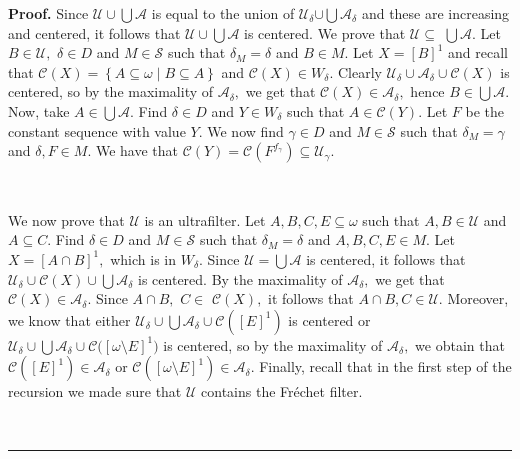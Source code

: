 \documentclass{article}%
\newenvironment{proof}[1][Proof]{\noindent\textbf{#1.} }{\ \rule{0.5em}{0.5em}}
\begin{document}
\begin{proof}
Since $\mathcal{U\cup}%
{\textstyle\bigcup}
\mathcal{A}$ is equal to the union of $\mathcal{U}_{\delta}\mathcal{\cup}%
{\textstyle\bigcup}
\mathcal{A}_{\delta}$ and these are increasing and centered, it follows that
$\mathcal{U\cup}%
{\textstyle\bigcup}
\mathcal{A}$ is centered. We prove that $\mathcal{U\subseteq}$ $%
{\textstyle\bigcup}
\mathcal{A}.$ Let $B\in\mathcal{U},$ $\delta\in D$ and $M\in\mathcal{S}$ such
that $\delta_{M}=\delta$ and $B\in M.$ Let $X=\left[  B\right]  ^{1}$ and
recall that $\mathcal{C}\left(  X\right)  =\left\{  A\subseteq\omega\mid
B\subseteq A\right\}  $ and $\mathcal{C}\left(  X\right)  \in W_{\delta}$.
Clearly $\mathcal{U}_{\delta}\cup\mathcal{A}_{\delta}\cup\mathcal{C}\left(
X\right)  $ is centered, so by the maximality of $\mathcal{A}_{\delta},$ we
get that $\mathcal{C}\left(  X\right)  \in\mathcal{A}_{\delta},$ hence $B\in%
{\textstyle\bigcup}
\mathcal{A}.$ Now, take $A\in%
{\textstyle\bigcup}
\mathcal{A}.$ Find $\delta\in D$ and $Y\in W_{\delta}$ such that
$A\in\mathcal{C}\left(  Y\right)  .$ Let $F$ be the constant sequence with
value $Y.$ We now find $\gamma\in D$ and $M\in\mathcal{S}$ such that
$\delta_{M}=\gamma$ and $\delta,F\in M.$ We have that $\mathcal{C}\left(
Y\right)  =\mathcal{C}\left(  F^{f_{\gamma}}\right)  \subseteq\mathcal{U}%
_{\gamma}.$

\qquad\qquad\ \ \qquad\ \ \ 

We now prove that $\mathcal{U}$ is an ultrafilter. Let $A,B,C,E\subseteq
\omega$ such that $A,B\in\mathcal{U}$ and $A\subseteq C.$ Find $\delta\in D$
and $M\in\mathcal{S}$ such that $\delta_{M}=\delta$ and $A,B,C,E\in M.$ Let
$X=\left[  A\cap B\right]  ^{1},$ which is in $W_{\delta}.$ Since $\mathcal{U=%
{\textstyle\bigcup}
A}$ is centered, it follows that $\mathcal{U}_{\delta}\cup\mathcal{C}\left(
X\right)  \cup%
{\textstyle\bigcup}
\mathcal{A}_{\delta}$ is centered. By the maximality of $\mathcal{A}_{\delta
},$ we get that $\mathcal{C}\left(  X\right)  \in\mathcal{A}_{\delta}.$ Since
$A\cap B,$ $C\in$ $\mathcal{C}\left(  X\right)  ,$ it follows that $A\cap
B,C\in\mathcal{U}.$ Moreover, we know that either $\mathcal{U}_{\delta}\cup%
{\textstyle\bigcup}
\mathcal{A}_{\delta}\cup\mathcal{C}(\left[  E\right]  ^{1})$ is centered or
$\mathcal{U}_{\delta}\cup%
{\textstyle\bigcup}
\mathcal{A}_{\delta}\cup\mathcal{C(}\left[  \omega\setminus E\right]  ^{1})$
is centered, so by the maximality of $\mathcal{A}_{\delta},$ we obtain that
$\mathcal{C}\left(  \left[  E\right]  ^{1}\right)  \in\mathcal{A}_{\delta}$ or
$\mathcal{C}\left(  \left[  \omega\setminus E\right]  ^{1}\right)
\in\mathcal{A}_{\delta}.$ Finally, recall that in the first step of the
recursion we made sure that $\mathcal{U}$ contains the Fr\'{e}chet filter.


\end{proof}
\end{document}
